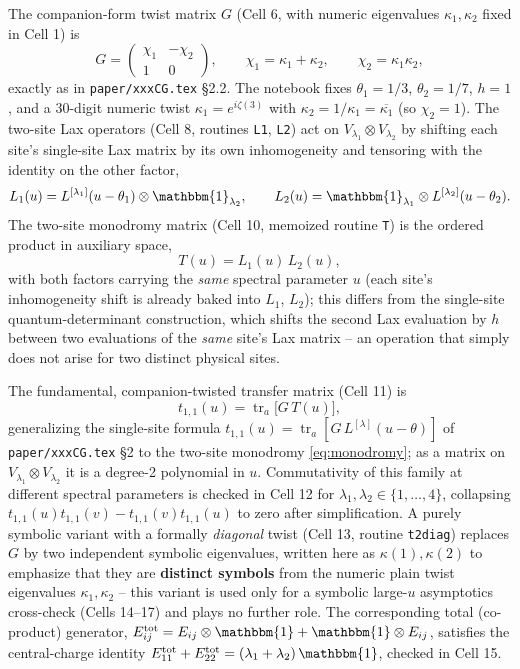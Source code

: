 \documentclass[11pt]{article}
\begin{document}
The companion-form twist matrix $G$ (Cell 6, with numeric eigenvalues $\kappa_1,\kappa_2$ fixed in
Cell 1) is
\begin{equation}
  G = \begin{pmatrix} \chi_1 & -\chi_2 \\ 1 & 0 \end{pmatrix}, \qquad
  \chi_1=\kappa_1+\kappa_2, \qquad \chi_2=\kappa_1\kappa_2,
  \label{eq:G}
\end{equation}
exactly as in \texttt{paper/xxxCG.tex} \S2.2. The notebook fixes $\theta_1=1/3$, $\theta_2=1/7$,
$h=1$, and a 30-digit numeric twist $\kappa_1=e^{i\zeta(3)}$ with $\kappa_2=1/\kappa_1=\overline{\kappa_1}$
(so $\chi_2=1$). The two-site Lax operators (Cell 8, routines \texttt{L1}, \texttt{L2}) act on
$V_{\lambda_1}\otimes V_{\lambda_2}$ by shifting each site's single-site Lax matrix by its own
inhomogeneity and tensoring with the identity on the other factor,
\[
  L_1(u) = L^{[\lambda_1]}(u-\theta_1)\otimes \mathbbm{1}_{\lambda_2}, \qquad
  L_2(u) = \mathbbm{1}_{\lambda_1}\otimes L^{[\lambda_2]}(u-\theta_2).
\]
The two-site monodromy matrix (Cell 10, memoized routine \texttt{T}) is the ordered product in
auxiliary space,
\begin{equation}
  T(u) = L_1(u)\, L_2(u),
  \label{eq:monodromy}
\end{equation}
with both factors carrying the \emph{same} spectral parameter $u$ (each site's inhomogeneity shift
is already baked into $L_1$, $L_2$); this differs from the single-site quantum-determinant
construction, which shifts the second Lax evaluation by $h$ between two evaluations of the
\emph{same} site's Lax matrix -- an operation that simply does not arise for two distinct physical
sites.

The fundamental, companion-twisted transfer matrix (Cell 11) is
\begin{equation}
  t_{1,1}(u) = \operatorname{tr}_a\!\bigl[G\,T(u)\bigr],
  \label{eq:t11}
\end{equation}
generalizing the single-site formula $t_{1,1}(u)=\operatorname{tr}_a[G\,L^{[\lambda]}(u-\theta)]$ of
\texttt{paper/xxxCG.tex} \S2 to the two-site monodromy \eqref{eq:monodromy}; as a matrix on
$V_{\lambda_1}\otimes V_{\lambda_2}$ it is a degree-2 polynomial in $u$. Commutativity of this
family at different spectral parameters is checked in Cell 12 for $\lambda_1,\lambda_2\in\{1,\dots,4\}$,
collapsing $t_{1,1}(u)t_{1,1}(v)-t_{1,1}(v)t_{1,1}(u)$ to zero after simplification. A purely
symbolic variant with a formally \emph{diagonal} twist (Cell 13, routine \texttt{t2diag}) replaces
$G$ by two independent symbolic eigenvalues, written here as $\kappa(1),\kappa(2)$ to emphasize that
they are \textbf{distinct symbols} from the numeric plain twist eigenvalues $\kappa_1,\kappa_2$ --
this variant is used only for a symbolic large-$u$ asymptotics cross-check (Cells 14--17) and plays
no further role. The corresponding total (co-product) generator, $E_{ij}^{\mathrm{tot}} =
E_{ij}\otimes\mathbbm{1} + \mathbbm{1}\otimes E_{ij}$, satisfies the central-charge identity
$E_{11}^{\mathrm{tot}}+E_{22}^{\mathrm{tot}}=(\lambda_1+\lambda_2)\,\mathbbm{1}$, checked in Cell 15.
\end{document}
